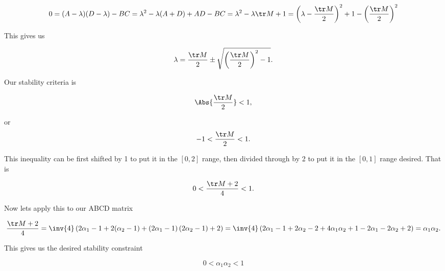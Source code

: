 {\begin{dmath}\label{eqn:problemSet4Problem2:940}
0 
= (A - \lambda)(D - \lambda) - B C
= \lambda^2 - \lambda( A + D ) + A D - BC
= \lambda^2 - \lambda \tr M + 1
= \left(\lambda - \frac{\tr M}{2}\right)^2 + 1 - \left(\frac{\tr M}{2}\right)^2 
\end{dmath}

This gives us

\begin{dmath}\label{eqn:problemSet4Problem2:960}
\lambda = 
\frac{\tr M}{2} \pm \sqrt{ \left(\frac{\tr M}{2}\right)^2 - 1 }.
\end{dmath}

Our stability criteria is

\begin{dmath}\label{eqn:problemSet4Problem2:980}
\Abs{ \frac{\tr M}{2} } < 1,
\end{dmath}

or
\begin{equation}\label{eqn:problemSet4Problem2:1000}
-1 < \frac{\tr M}{2} < 1.
\end{equation}

This inequality can be first shifted by 1 to put it in the $[0,2]$ range, then divided through by 2 to put it in the $[0, 1]$ range desired.  That is


\begin{equation}\label{eqn:problemSet4Problem2:1020}
0 < \frac{\tr M + 2 }{4} < 1.
\end{equation}

Now lets apply this to our ABCD matrix 

\begin{dmath}\label{eqn:problemSet4Problem2:1040}
\frac{\tr M + 2 }{4} 
=
\inv{4}
\left( 
2 \alpha_1 - 1 
+
2(\alpha_2 - 1) + 
\left(
2 \alpha_1 - 1
\right)
\left(
2 \alpha_2 - 1
\right)
+ 2 
\right)
=
\inv{4}
\left( 
2 \alpha_1 - 1 
+
2 \alpha_2 - 2 + 
4 \alpha_1 \alpha_2 + 1 - 2 \alpha_1 - 2 \alpha_2
+ 2 
\right)
=
\alpha_1 \alpha_2.
\end{dmath}

This gives us the desired stability constraint

\begin{equation}\label{eqn:problemSet4Problem2:1060}
\boxed{
0 < \alpha_1 \alpha_2 < 1
}
\end{equation}

}
